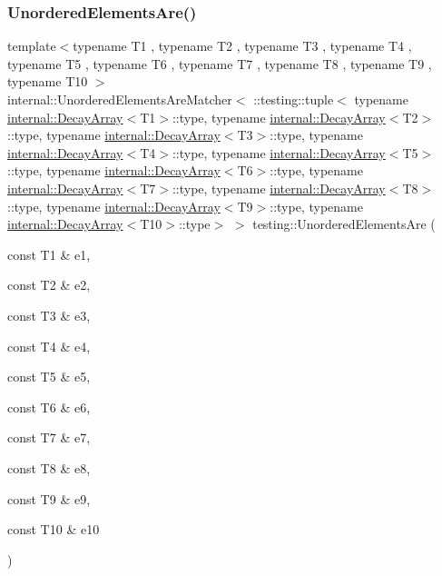 \subsubsection{\texorpdfstring{UnorderedElementsAre()}{UnorderedElementsAre()}\hspace{0.1cm}{\footnotesize\ttfamily [11/11]}}
{\footnotesize\ttfamily template$<$typename T1 , typename T2 , typename T3 , typename T4 , typename T5 , typename T6 , typename T7 , typename T8 , typename T9 , typename T10 $>$ \\
internal\+::\+Unordered\+Elements\+Are\+Matcher$<$ \+::testing\+::tuple$<$ typename \mbox{\hyperlink{structtesting_1_1internal_1_1_decay_array}{internal\+::\+Decay\+Array}}$<$T1$>$\+::type, typename \mbox{\hyperlink{structtesting_1_1internal_1_1_decay_array}{internal\+::\+Decay\+Array}}$<$T2$>$\+::type, typename \mbox{\hyperlink{structtesting_1_1internal_1_1_decay_array}{internal\+::\+Decay\+Array}}$<$T3$>$\+::type, typename \mbox{\hyperlink{structtesting_1_1internal_1_1_decay_array}{internal\+::\+Decay\+Array}}$<$T4$>$\+::type, typename \mbox{\hyperlink{structtesting_1_1internal_1_1_decay_array}{internal\+::\+Decay\+Array}}$<$T5$>$\+::type, typename \mbox{\hyperlink{structtesting_1_1internal_1_1_decay_array}{internal\+::\+Decay\+Array}}$<$T6$>$\+::type, typename \mbox{\hyperlink{structtesting_1_1internal_1_1_decay_array}{internal\+::\+Decay\+Array}}$<$T7$>$\+::type, typename \mbox{\hyperlink{structtesting_1_1internal_1_1_decay_array}{internal\+::\+Decay\+Array}}$<$T8$>$\+::type, typename \mbox{\hyperlink{structtesting_1_1internal_1_1_decay_array}{internal\+::\+Decay\+Array}}$<$T9$>$\+::type, typename \mbox{\hyperlink{structtesting_1_1internal_1_1_decay_array}{internal\+::\+Decay\+Array}}$<$T10$>$\+::type$>$ $>$ testing\+::\+Unordered\+Elements\+Are (\begin{DoxyParamCaption}\item[{const T1 \&}]{e1,  }\item[{const T2 \&}]{e2,  }\item[{const T3 \&}]{e3,  }\item[{const T4 \&}]{e4,  }\item[{const T5 \&}]{e5,  }\item[{const T6 \&}]{e6,  }\item[{const T7 \&}]{e7,  }\item[{const T8 \&}]{e8,  }\item[{const T9 \&}]{e9,  }\item[{const T10 \&}]{e10 }\end{DoxyParamCaption})\hspace{0.3cm}{\ttfamily [inline]}}

